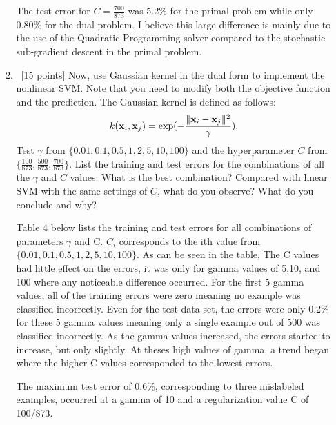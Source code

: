 \documentclass[12pt, fullpage,letterpaper]{article}
\begin{document}
\begin{enumerate}
\begin{enumerate}
	The test error for $C=\frac{700}{873}$ was 5.2$\%$ for the primal problem while only 0.80$\%$ for the dual problem. I believe this large difference is mainly due to the use of the Quadratic Programming solver compared to the stochastic sub-gradient descent in the primal problem. 
	
	
	\item~[15 points] Now, use Gaussian kernel in the dual form to implement the nonlinear SVM. Note that you need to modify both the objective function and the prediction. The Gaussian kernel is defined as follows:
	\[
	k({\bf x}_i, {\bf x}_j) = \exp(-\frac{\|{\bf x}_i - {\bf x}_j\|^2}{\gamma}).
	\]
	Test $\gamma$ from $\{0.01, 0.1, 0.5, 1, 2, 5, 10, 100\}$ and the hyperparameter $C$ from $\{ \frac{100}{873}, \frac{500}{873},  \frac{700}{873}\}$. List the training and test errors for the combinations of all the $\gamma$ and $C$ values. What is the best combination? Compared with linear SVM with the same settings of $C$, what do you observe? What do you conclude and why?  
	
	Table 4 below lists the training and test errors for all combinations of parameters $\gamma$ and C. $C_i$ corresponds to the ith value from $\{0.01, 0.1, 0.5, 1, 2, 5, 10, 100\}$. As can be seen in the table, The C values had little effect on the errors, it was only for gamma values of 5,10, and 100 where any noticeable difference occurred. For the first 5 gamma values, all of the training errors were zero meaning no example was classified incorrectly. Even for the test data set, the errors were only 0.2$\%$ for these 5 gamma values meaning only a single example out of 500 was classified incorrectly. As the gamma values increased, the errors started to increase, but only slightly. At theses high values of gamma, a trend began where the higher C values corresponded to the lowest errors. 
	
	The maximum test error of 0.6$\%$, corresponding to three mislabeled examples, occurred at a gamma of 10 and a regularization value C of 100/873.
	

\end{enumerate}
\end{enumerate}
\end{document}
